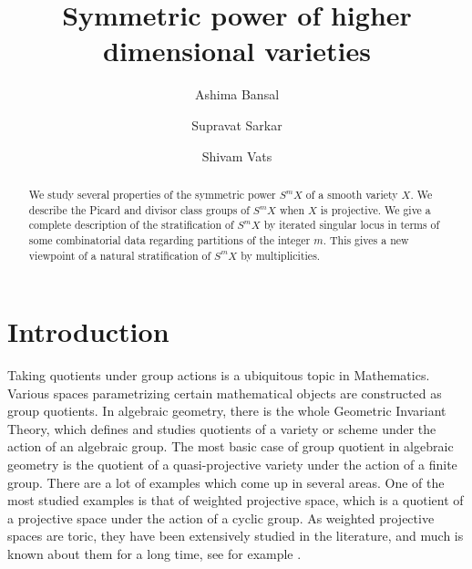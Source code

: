 \documentclass[12pt,reqno]{amsart}
\theoremstyle{definition}
\numberwithin{equation}{section}
\begin{document}
\title[Symmetric power of higher dimensional varieties]{Symmetric power of higher dimensional varieties}


\author[A. Bansal]{Ashima Bansal}

\address{Indian Institute of Science Education and Research Tirupati, Srinivasapuram, Yerpedu Mandal, Tirupati Dist, Andhra Pradesh, India – 517619.}


\author[S. Sarkar]{Supravat Sarkar}

\address{\scshape Fine Hall, Princeton, NJ 700108}


\author[S. Vats]{Shivam Vats}





\begin{abstract}
We study several properties of the symmetric power $S^mX$ of a smooth variety $X$. We describe the Picard and divisor class groups of $S^mX$ when $X$ is projective. We give a complete description of the stratification of $S^mX$ by iterated singular locus in terms of some combinatorial data regarding partitions of the integer $m.$ This gives a new viewpoint of a natural stratification of $S^mX$ by multiplicities.
 \end{abstract}
\maketitle



\section{Introduction}
\noindent Taking quotients under group actions is a ubiquitous topic in Mathematics. Various spaces parametrizing certain mathematical objects are constructed as group quotients. In algebraic geometry, there is the whole Geometric Invariant Theory, which defines and studies quotients of a variety or scheme under the action of an algebraic group. The most basic case of group quotient in algebraic geometry is the quotient of a quasi-projective variety under the action of a finite group. There are a lot of examples which come up in several areas. One of the most studied examples is that of weighted projective space, which is a quotient of a projective space under the action of a cyclic group. As weighted projective spaces are toric, they have been extensively studied in the literature, and much is known about them for a long time, see for example \cite{Do}.
\end{document}
